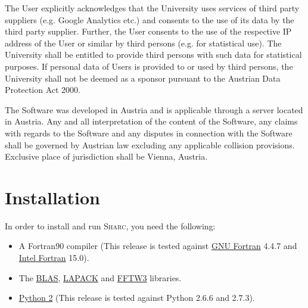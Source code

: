 \documentclass[a4paper,11pt,DIV=15,openany,twoside=false]{scrbook}
\newcommand{\sharc}{\textsc{Sharc}}
\begin{document}
{\begin{shaded}

The User explicitly acknowledges that the University uses services of third party suppliers (e.g. Google Analytics etc.) and consents to the use of its data by the third party supplier. Further, the User consents to the use of the respective IP address of the User or similar by third persons (e.g. for statistical use). The University shall be entitled to provide third persons with such data for statistical purposes. If personal data of Users is provided to or used by third persons, the University shall not be deemed as a sponsor pursuant to the Austrian Data Protection Act 2000.


The Software was developed in Austria and is applicable through a server located in Austria. Any and all interpretation of the content of the Software, any claims with regards to the Software and any disputes in connection with the Software shall be governed by Austrian law excluding any applicable collision provisions. Exclusive place of jurisdiction shall be Vienna, Austria.

\end{shaded}
}


% 
% 


\section{Installation}

In order to install and run \sharc, you need the following:
\begin{itemize}
  \item A Fortran90 compiler (This release is tested against \href{https://gcc.gnu.org/fortran/}{GNU Fortran} 4.4.7 and \href{https://software.intel.com/en-us/fortran-compilers}{Intel Fortran} 15.0).
  \item The \href{http://www.netlib.org/blas/}{BLAS}, \href{http://www.netlib.org/lapack/}{LAPACK} and \href{http://http://www.fftw.org/}{FFTW3} libraries.
  \item \href{https://www.python.org/downloads/release/python-278/}{Python 2} (This release is tested against Python 2.6.6 and 2.7.3).
\end{itemize}
\end{document}
